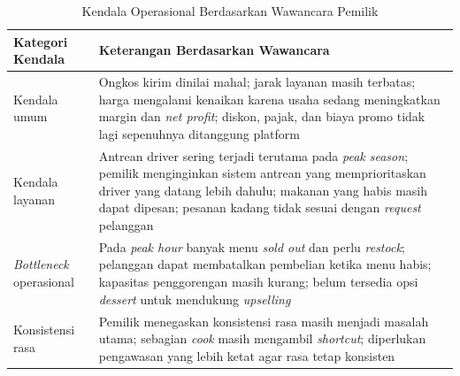 \begin{table}[!htbp]
    \centering
    \caption{Kendala Operasional Berdasarkan Wawancara Pemilik}
    \label{tab:kendala_wawancara}
    \begin{tabularx}{\textwidth}{|J|Y|}
        \toprule
        \textbf{Kategori Kendala}       & \textbf{Keterangan Berdasarkan Wawancara}                                                                                                                                                                                                                         \\ \hline
        \midrule
        Kendala umum                    & Ongkos kirim dinilai mahal; jarak layanan masih terbatas; harga mengalami kenaikan karena usaha sedang meningkatkan margin dan \textit{net profit}; diskon, pajak, dan biaya promo tidak lagi sepenuhnya ditanggung platform                                      \\ \hline
        Kendala layanan                 & Antrean driver sering terjadi terutama pada \textit{peak season}; pemilik menginginkan sistem antrean yang memprioritaskan driver yang datang lebih dahulu; makanan yang habis masih dapat dipesan; pesanan kadang tidak sesuai dengan \textit{request} pelanggan \\ \hline
        \textit{Bottleneck} operasional & Pada \textit{peak hour} banyak menu \textit{sold out} dan perlu \textit{restock}; pelanggan dapat membatalkan pembelian ketika menu habis; kapasitas penggorengan masih kurang; belum tersedia opsi \textit{dessert} untuk mendukung \textit{upselling}           \\ \hline
        Konsistensi rasa                & Pemilik menegaskan konsistensi rasa masih menjadi masalah utama; sebagian \textit{cook} masih mengambil \textit{shortcut}; diperlukan pengawasan yang lebih ketat agar rasa tetap konsisten                                                                       \\ \hline
        \bottomrule
    \end{tabularx}
\end{table}

